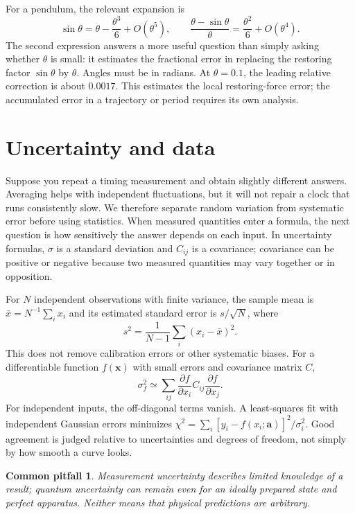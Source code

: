 \documentclass[11pt,oneside]{book}
\newcommand{\vect}[1]{\boldsymbol{#1}}
\newcommand{\pd}[2]{\frac{\partial #1}{\partial #2}}
\theoremstyle{reviewstyle}
\newtheorem*{pitfall}{Common pitfall}
\begin{document}
For a pendulum, the relevant expansion is
\begin{equation}
\sin\theta=\theta-\frac{\theta^3}{6}+O(\theta^5),\qquad
\frac{\theta-\sin\theta}{\theta}=\frac{\theta^2}{6}+O(\theta^4).
\end{equation}
The second expression answers a more useful question than simply asking whether $\theta$ is small: it estimates the fractional error in replacing the restoring factor $\sin\theta$ by $\theta$. Angles must be in radians. At $\theta=0.1$, the leading relative correction is about $0.0017$. This estimates the local restoring-force error; the accumulated error in a trajectory or period requires its own analysis.

\section{Uncertainty and data}
Suppose you repeat a timing measurement and obtain slightly different answers. Averaging helps with independent fluctuations, but it will not repair a clock that runs consistently slow. We therefore separate random variation from systematic error before using statistics. When measured quantities enter a formula, the next question is how sensitively the answer depends on each input. In uncertainty formulas, $\sigma$ is a standard deviation and $C_{ij}$ is a covariance; covariance can be positive or negative because two measured quantities may vary together or in opposition.

For $N$ independent observations with finite variance, the sample mean is $\bar x=N^{-1}\sum_i x_i$ and its estimated standard error is $s/\sqrt N$, where
\begin{equation}
s^2=\frac{1}{N-1}\sum_i(x_i-\bar x)^2.
\end{equation}
This does not remove calibration errors or other systematic biases. For a differentiable function $f(\vect x)$ with small errors and covariance matrix $C$,
\begin{equation}
\sigma_f^2\simeq\sum_{ij}\pd{f}{x_i}C_{ij}\pd{f}{x_j}.
\end{equation}
For independent inputs, the off-diagonal terms vanish. A least-squares fit with independent Gaussian errors minimizes
$\chi^2=\sum_i[y_i-f(x_i;\vect a)]^2/\sigma_i^2$.
Good agreement is judged relative to uncertainties and degrees of freedom, not simply by how smooth a curve looks.
\begin{pitfall}
Measurement uncertainty describes limited knowledge of a result; quantum uncertainty can remain even for an ideally prepared state and perfect apparatus. Neither means that physical predictions are arbitrary.
\end{pitfall}
\end{document}
